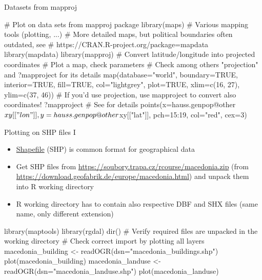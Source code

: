 \documentclass[compress, ucs, xelatex, 11pt, xcolor=svgnames, aspectratio=169,
	hyperref={
		bookmarks=true,
		unicode=true,
		colorlinks=true,
		pdftitle={Molecular data in R},
		plainpages=false,
		pdfauthor={Vojtech Zeisek},
		pdfsubject={Course about phylogeny and evolution in R},
		pdfcreator={XeLaTeX},
		pdfkeywords={R, evolution, phylogeny, molecular data},
		linkcolor=Crimson, %
		anchorcolor=Magenta, %
		citecolor=Magenta, %
		filecolor=Magenta, %
		menucolor=Magenta, %
		urlcolor=DodgerBlue, %
		pdftex},
	url={hyphens, lowtilde} %
	]{beamer}
\begin{document}
\begin{frame}[fragile]{Datasets from mapproj}
	\begin{spluscode}
    # Plot on data sets from mapproj package
    library(maps) # Various mapping tools (plotting, ...)
    # More detailed maps, but political boundaries often outdated, see
    # https://CRAN.R-project.org/package=mapdata
    library(mapdata)
    library(mapproj)
    # Convert latitude/longitude into projected coordinates
    # Plot a map, check parameters
    # Check among others "projection" and ?mapproject for its details
    map(database="world", boundary=TRUE, interior=TRUE, fill=TRUE,
      col="lightgrey", plot=TRUE, xlim=c(16, 27), ylim=c(37, 46))
    # If you'd use projection, use mapproject to convert also coordinates!
    ?mapproject # See for details
    points(x=hauss.genpop@other$xy[["lon"]], y=hauss.genpop@other$xy[["lat"]],
      pch=15:19, col="red", cex=3)
	\end{spluscode}
\end{frame}

\begin{frame}[fragile]{Plotting on SHP files I}
	\begin{itemize}
		\item \href{https://en.wikipedia.org/wiki/Shapefile}{Shapefile} (SHP) is common format for geographical data
		\item Get SHP files from \url{https://soubory.trapa.cz/rcourse/macedonia.zip} (from \url{https://download.geofabrik.de/europe/macedonia.html}) and unpack them into R working directory
		\item R working directory has to contain also respective DBF and SHX files (same name, only different extension)
	\end{itemize}
	\begin{spluscode}
    library(maptools)
    library(rgdal)
    dir() # Verify required files are unpacked in the working directory
    # Check correct import by plotting all layers
    macedonia_building <- readOGR(dsn="macedonia_buildings.shp")
    plot(macedonia_building)
    macedonia_landuse <- readOGR(dsn="macedonia_landuse.shp")
    plot(macedonia_landuse)
	\end{spluscode}
\end{frame}
\end{document}

